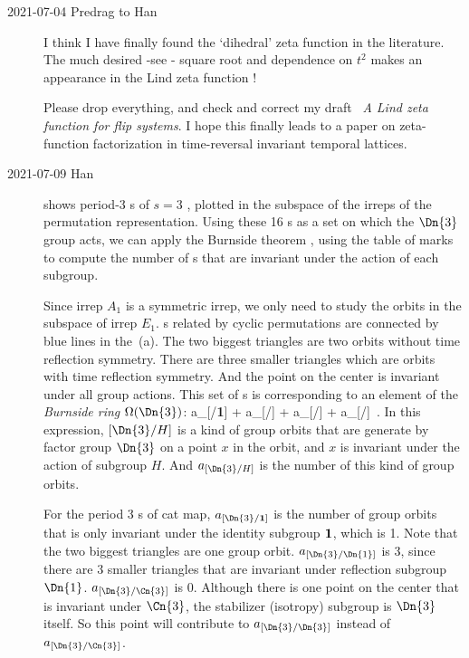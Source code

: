 \begin{description}
\item[2021-07-04 Predrag to Han]
I think I have finally found the `dihedral' zeta function in the literature.
The much desired -see - square root  and dependence
on $t^2$ makes an appearance in the Lind zeta function !

Please drop everything, and check and correct my draft
~{\em A Lind zeta function for flip systems}.
I hope this finally leads to a paper on zeta-function factorization in
time-reversal invariant temporal lattices.

\item[2021-07-09 Han]
 shows period-3 {\lattstate}s of $s=3$
\templatt, plotted in the subspace of the irreps   of the
permutation representation. Using these 16 {\lattstate}s as a set on which
the $\Dn{3}$ group acts, we can apply the Burnside theorem
, using the
 table of marks  to compute the number of
{\lattstate}s that are invariant under the action of each subgroup.

Since irrep $A_1$ is a symmetric irrep, we only need to study the orbits in the subspace of
irrep $E_1$. {\Lattstate}s related by cyclic permutations are connected by blue lines in the
\,(a). The two biggest triangles are two orbits without
time reflection symmetry. There are three smaller triangles which are orbits with time reflection
symmetry. And the point on the center is invariant under all group actions. This set of {\lattstate}s is corresponding to an element of the \emph{Burnside ring} $\Omega(\Dn{3})$:
\beq
a_{[/{\bf 1}]}  +
a_{[/]}  +
a_{[/]}  +
a_{[/]}  \,.
In this expression, $[{\Dn{3}/H}]$ is a kind of group orbits that are generate
by factor group $\Dn{3}$
on a point $x$ in the orbit, and $x$ is invariant under the action of subgroup $H$.
And $a_{[\Dn{3}/H]}$ is the number of this kind of group orbits.

For the period 3 {\lattstate}s of cat map, $a_{[\Dn{3}/{\bf 1}]}$ is the number of
group orbits that is only invariant under the identity subgroup ${\bf 1}$, which is 1.
Note that the two biggest triangles are one group orbit. $a_{[\Dn{3}/\Dn{1}]}$ is 3,
since there are 3 smaller triangles that are invariant under reflection subgroup $\Dn{1}$.
$a_{[\Dn{3}/\Cn{3}]}$ is 0. Although there is one point on the center that is invariant under
$\Cn{3}$, the stabilizer (isotropy) subgroup is $\Dn{3}$ itself. So this point will contribute
to $a_{[\Dn{3}/\Dn{3}]}$ instead of $a_{[\Dn{3}/\Cn{3}]}$.


\end{description}
